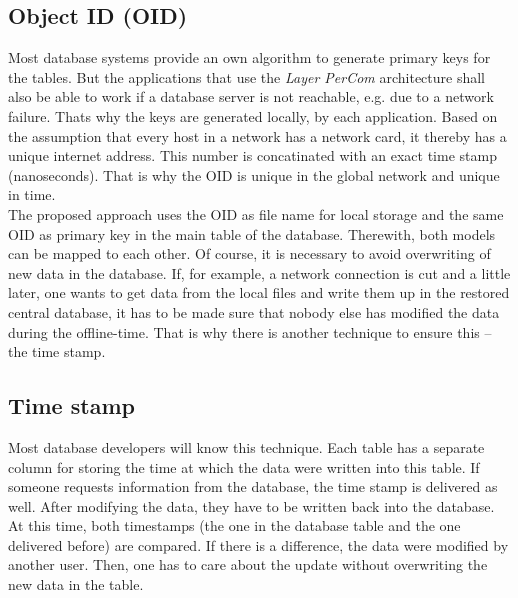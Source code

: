 \subsection{Object ID (OID)}
\label{object_id_section}

Most database systems provide an own algorithm to generate primary keys for the
tables. But the applications that use the \emph{Layer PerCom} architecture shall
also be able to work if a database server is not reachable, e.g. due to a network
failure. Thats why the keys are generated locally, by each application.
Based on the assumption that every host in a network has a network card, it thereby
has a unique internet address. This number is concatinated with an exact time stamp
(nanoseconds). That is why the OID is unique in the global network and unique in time.\\
The proposed approach uses the OID as file name for local storage and the same
OID as primary key in the main table of the database. Therewith, both models can
be mapped to each other. Of course, it is necessary to avoid overwriting of new
data in the database. If, for example, a network connection is cut and a little
later, one wants to get data from the local files and write them up in the restored
central database, it has to be made sure that nobody else has modified the data
during the offline-time. That is why there is another technique to ensure this
-- the time stamp.

\subsection{Time stamp}
\label{time_stamp_section}

Most database developers will know this technique. Each table has a separate
column for storing the time at which the data were written into this table.
If someone requests information from the database, the time stamp is delivered
as well. After modifying the data, they have to be written back into the database.
At this time, both timestamps (the one in the database table and the one delivered
before) are compared. If there is a difference, the data were modified by another
user. Then, one has to care about the update without overwriting the new data in
the table.
